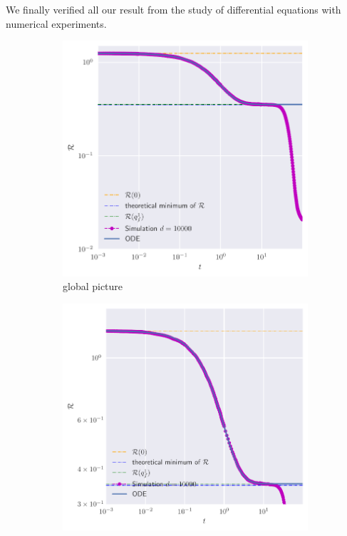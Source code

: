 We finally verified all our result from the study of differential equations with numerical experiments.
\begin{figure}
  \centering
  \begin{subfigure}{0.495\textwidth}
    \includegraphics[width=1.\textwidth]{figures/example-eps0.pdf}
    \caption{global picture}
  \end{subfigure}
  \begin{subfigure}{0.495\textwidth}
    \includegraphics[width=1.\textwidth]{figures/example-eps0-zoomed.pdf}

\end{subfigure}
\end{figure}
